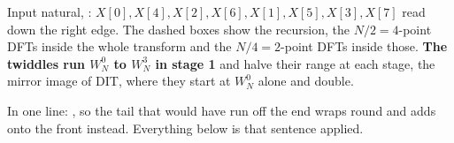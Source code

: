 {\color{sub}\footnotesize Input natural, :
$X[0],X[4],X[2],X[6],X[1],X[5],X[3],X[7]$ read down the right edge. The dashed boxes
show the recursion, the $N/2=4$-point DFTs inside the whole transform and the
$N/4=2$-point DFTs inside those. \textbf{The twiddles run $W_N^0$ to $W_N^3$ in stage 1}
and halve their range at each stage, the mirror image of DIT, where they start at
$W_N^0$ alone and double.}

\hr


{\color{sub}\footnotesize {} }

{\color{sub}\footnotesize In one line: , so the tail that would have run off the end wraps
round and adds onto the front instead. Everything below is that sentence applied.}

